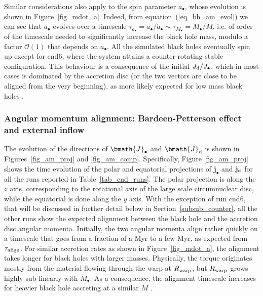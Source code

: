 \documentclass[a4paper,fleqn,usenatbib]{mnras}
\begin{document}
Similar considerations also apply to the spin parameter $a_{\bullet}$, whose evolution is shown in Figure~\ref{fig_mdot_a}.
Indeed, from equation~(\ref{eq_bh_am_evol}) we can see that $a_{\bullet}$ evolves over a timescale $\tau_{a_{\bullet}} = a_{\bullet} / \dot{a}_{\bullet} \sim \tau_{M_{\bullet}} = M_{\bullet}/\dot{M}$, i.e. of order of the timescale needed to significantly increase the black hole mass, modulo a factor $\mathcal{O}(1)$ that depends on $a_{\bullet}$.
All the simulated black holes eventually spin up except for cnd6, where the system attains a counter-rotating stable configuration.
This behaviour is a consequence of the initial $J_{\rm d} / J_{\bullet}$, which in most cases is dominated by the accretion disc (or the two vectors are close to be aligned from the very beginning), as more likely expected for low mass black holes \citep{dotti+13}. 

\subsubsection{Angular momentum alignment: Bardeen-Petterson effect and external inflow}

The evolution of the directions of $\bmath{J}_{\bullet}$ and $\bmath{J}_{\rm d}$ is shown in Figures~\ref{fig_am_proj} and \ref{fig_am_comp}.
Specifically, Figure \ref{fig_am_proj} shows the time evolution of the polar and equatorial projections of $\mathbf{j}_{\bullet}$ and $\mathbf{j}_{\rm d}$ for all the runs reported in Table~\ref{tab_cnd_runs}.
The polar projection is along the $z$ axis, corresponding to the rotational axis of the large scale circumnuclear disc, while the equatorial is done along the $y$ axis.
With the exception of run cnd6, that will be discussed in further detail below in Section~\ref{subsub_counter}, all the other runs show the expected alignment between the black hole and the accretion disc angular momenta.
Initially, the two angular momenta align rather quickly on a timescale that goes from a fraction of a Myr to a few Myr, as expected from $\tau_{\rm align}$.
For similar accretion rates as shown in Figure~\ref{fig_mdot_a}, the alignment takes longer for black holes with larger masses.
Physically, the torque originates mostly from the material flowing through the warp at $R_{\rm warp}$, but $R_{\rm warp}$ grows highly sub-linearly with $M_{\bullet}$.
As a consequence, the alignment timescale increases for heavier black hole accreting at a similar $\dot{M}$ \citep{lodato+06,martin+07,dotti+13}.
\end{document}
